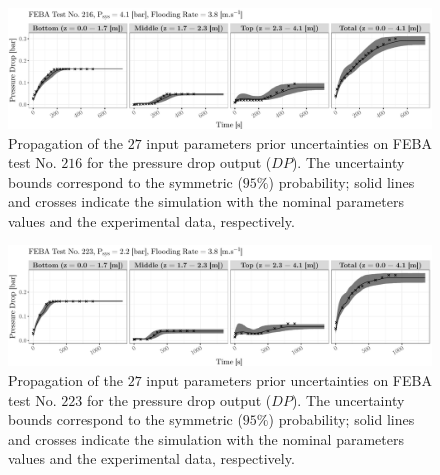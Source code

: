 \begin{figure}[bth]
    \centering
    \includegraphics[width=1.0\textwidth]{../figures/chapter2/figures/plotTraceUQPriorDP216}
    \caption[Propagation of the $27$ input parameters prior uncertainties on FEBA test No. $216$ for the pressure drop output ($DP$).]{Propagation of the $27$ input parameters prior uncertainties on FEBA test No. $216$ for the pressure drop output ($DP$). The uncertainty bounds correspond to the symmetric ($95\%$) probability; solid lines and crosses indicate the simulation with the nominal parameters values and the experimental data, respectively.}
    \label{fig:ch2_app_plot_trace_uq_prior_dp_216}
\end{figure}

\begin{figure}[!h]
    \centering
    \includegraphics[width=1.0\textwidth]{../figures/chapter2/figures/plotTraceUQPriorDP223}
    \caption[Propagation of the $27$ input parameters prior uncertainties on FEBA test No. $223$ for the pressure drop output ($DP$).]{Propagation of the $27$ input parameters prior uncertainties on FEBA test No. $223$ for the pressure drop output ($DP$). The uncertainty bounds correspond to the symmetric ($95\%$) probability; solid lines and crosses indicate the simulation with the nominal parameters values and the experimental data, respectively.}
    \label{fig:ch2_plot_trace_uq_prior_dp_223}
\end{figure}

\clearpage


